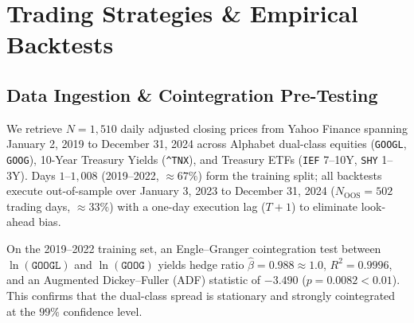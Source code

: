 \documentclass[10pt,twocolumn]{article}
\begin{document}
\begin{table}[t!]
\centering
\caption{In-Sample Model Calibration (2019--2022 Training Period, $N=1{,}008$)}
\label{tab:calib}
\end{table}

\section{Trading Strategies \& Empirical Backtests}

\subsection{Data Ingestion \& Cointegration Pre-Testing}
We retrieve $N=1{,}510$ daily adjusted closing prices from Yahoo Finance spanning January 2, 2019 to December 31, 2024 across Alphabet dual-class equities (\texttt{GOOGL}, \texttt{GOOG}), 10-Year Treasury Yields (\texttt{\^{}TNX}), and Treasury ETFs (\texttt{IEF} 7--10Y, \texttt{SHY} 1--3Y). Days $1$--$1{,}008$ (2019--2022, $\approx 67\%$) form the training split; all backtests execute out-of-sample over January 3, 2023 to December 31, 2024 ($N_{\mathrm{OOS}}=502$ trading days, $\approx 33\%$) with a one-day execution lag ($T+1$) to eliminate look-ahead bias.

On the 2019--2022 training set, an Engle--Granger cointegration test between $\ln(\texttt{GOOGL})$ and $\ln(\texttt{GOOG})$ yields hedge ratio $\hat{\beta} = 0.988 \approx 1.0$, $R^2 = 0.9996$, and an Augmented Dickey--Fuller (ADF) statistic of $-3.490$ ($p = 0.0082 < 0.01$). This confirms that the dual-class spread is stationary and strongly cointegrated at the $99\%$ confidence level.
\end{document}
